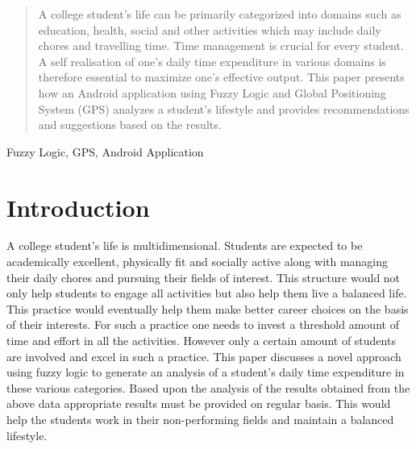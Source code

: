 \documentclass[conference]{IEEEtran}
\begin{document}
\begin{abstract}
A college student\rq s life can be primarily categorized into domains such as education, health, social and other activities which may include daily chores and travelling time. Time management is crucial for every student. A self realisation of one\rq s daily time expenditure in various domains is therefore essential to maximize one\rq s effective output. This paper presents how an Android application using Fuzzy Logic and Global Positioning System (GPS) analyzes a student\rq s lifestyle and provides recommendations and suggestions based on the results.
\end{abstract}

\begin{IEEEkeywords}
Fuzzy Logic, GPS, Android Application
\end{IEEEkeywords}






%
\IEEEpeerreviewmaketitle



\section{Introduction}

A college student\rq s life is multidimensional. Students are expected to be academically excellent, physically fit and socially active along with managing their daily chores and pursuing their fields of interest. This structure would not only help students to engage all activities but also help them live a balanced life. This practice would eventually help them make better career choices on the basis of their interests. For such a practice one needs to invest a threshold amount of time and effort in all the activities. However only a certain amount of students are involved and excel in such a practice. This paper discusses a novel approach using fuzzy logic to generate an analysis of a student\rq s daily time expenditure in these various categories. Based upon the analysis of the results obtained from the above data appropriate results must be provided on regular basis. This would help the students work in their non-performing fields and maintain a balanced lifestyle.
\end{document}
